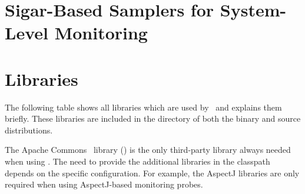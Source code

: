 \chapter{Sigar-Based Samplers for System-Level Monitoring}\label{appendix:SigarBasedSamplers}


\chapter{Libraries}\label{appendix:libraries}
    The following table shows all libraries which are used by \Kieker\ and explains them briefly. %
These libraries are included in the  directory of both the \Kieker{} binary and %
source distributions.

The Apache Commons~\cite{CommonsLogging-WebSite} library (\file{\commonsLoggingJar}) %
is the only third-party library always needed when using \Kieker{}. %
The need to provide the additional libraries in the classpath depends on the %
specific configuration. For example, the AspectJ libraries are only required %
when using AspectJ-based monitoring probes.



